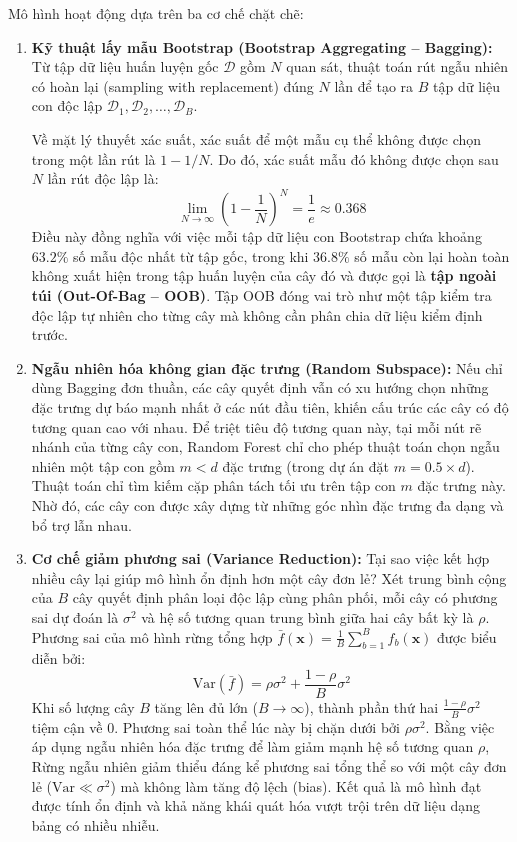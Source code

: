 Mô hình hoạt động dựa trên ba cơ chế chặt chẽ:
\begin{enumerate}
    \item \textbf{Kỹ thuật lấy mẫu Bootstrap (Bootstrap Aggregating -- Bagging):}
    Từ tập dữ liệu huấn luyện gốc $\mathcal{D}$ gồm $N$ quan sát, thuật toán rút ngẫu nhiên có hoàn lại (sampling with replacement) đúng $N$ lần để tạo ra $B$ tập dữ liệu con độc lập $\mathcal{D}_1, \mathcal{D}_2, \dots, \mathcal{D}_B$.
    
    Về mặt lý thuyết xác suất, xác suất để một mẫu cụ thể không được chọn trong một lần rút là $1 - 1/N$. Do đó, xác suất mẫu đó không được chọn sau $N$ lần rút độc lập là:
    \begin{equation}
        \lim_{N \to \infty} \left(1 - \frac{1}{N}\right)^N = \frac{1}{e} \approx 0.368
    \end{equation}
    Điều này đồng nghĩa với việc mỗi tập dữ liệu con Bootstrap chứa khoảng $63.2\%$ số mẫu độc nhất từ tập gốc, trong khi $36.8\%$ số mẫu còn lại hoàn toàn không xuất hiện trong tập huấn luyện của cây đó và được gọi là \textbf{tập ngoài túi (Out-Of-Bag -- OOB)}. Tập OOB đóng vai trò như một tập kiểm tra độc lập tự nhiên cho từng cây mà không cần phân chia dữ liệu kiểm định trước.

    \item \textbf{Ngẫu nhiên hóa không gian đặc trưng (Random Subspace):}
    Nếu chỉ dùng Bagging đơn thuần, các cây quyết định vẫn có xu hướng chọn những đặc trưng dự báo mạnh nhất ở các nút đầu tiên, khiến cấu trúc các cây có độ tương quan cao với nhau. Để triệt tiêu độ tương quan này, tại mỗi nút rẽ nhánh của từng cây con, Random Forest chỉ cho phép thuật toán chọn ngẫu nhiên một tập con gồm $m < d$ đặc trưng (trong dự án đặt $m = 0.5 \times d$). Thuật toán chỉ tìm kiếm cặp phân tách tối ưu trên tập con $m$ đặc trưng này. Nhờ đó, các cây con được xây dựng từ những góc nhìn đặc trưng đa dạng và bổ trợ lẫn nhau.

    \item \textbf{Cơ chế giảm phương sai (Variance Reduction):}
    Tại sao việc kết hợp nhiều cây lại giúp mô hình ổn định hơn một cây đơn lẻ? Xét trung bình cộng của $B$ cây quyết định phân loại độc lập cùng phân phối, mỗi cây có phương sai dự đoán là $\sigma^2$ và hệ số tương quan trung bình giữa hai cây bất kỳ là $\rho$. Phương sai của mô hình rừng tổng hợp $\bar{f}(\mathbf{x}) = \frac{1}{B}\sum_{b=1}^B f_b(\mathbf{x})$ được biểu diễn bởi:
    \begin{equation}
        \text{Var}(\bar{f}) = \rho \sigma^2 + \frac{1 - \rho}{B} \sigma^2
    \end{equation}
    Khi số lượng cây $B$ tăng lên đủ lớn ($B \to \infty$), thành phần thứ hai $\frac{1-\rho}{B}\sigma^2$ tiệm cận về 0. Phương sai toàn thể lúc này bị chặn dưới bởi $\rho \sigma^2$. Bằng việc áp dụng ngẫu nhiên hóa đặc trưng để làm giảm mạnh hệ số tương quan $\rho$, Rừng ngẫu nhiên giảm thiểu đáng kể phương sai tổng thể so với một cây đơn lẻ ($\text{Var} \ll \sigma^2$) mà không làm tăng độ lệch (bias). Kết quả là mô hình đạt được tính ổn định và khả năng khái quát hóa vượt trội trên dữ liệu dạng bảng có nhiều nhiễu.
\end{enumerate}

